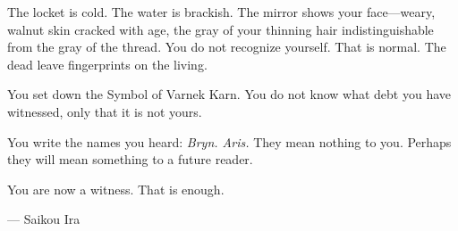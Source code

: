 The locket is cold. The water is brackish. The mirror shows your face---weary, walnut skin cracked with age, the gray of your thinning hair indistinguishable from the gray of the thread. You do not recognize yourself. That is normal. The dead leave fingerprints on the living.

You set down the Symbol of Varnek Karn. You do not know what debt you have witnessed, only that it is not yours.

You write the names you heard: \emph{Bryn. Aris.} They mean nothing to you. Perhaps they will mean something to a future reader.

You are now a witness. That is enough.

\begin{flushright}
--- Saikou Ira
\end{flushright}

\vspace{1em}


